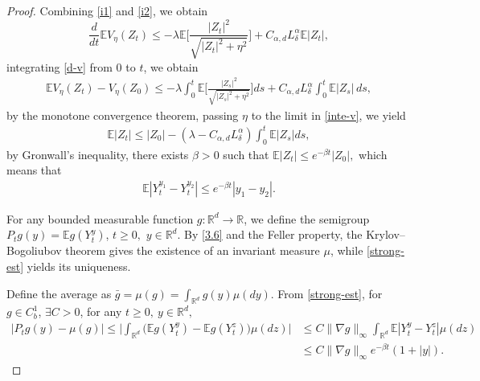 \documentclass[10pt,a4paper]{amsart}
\newcommand{\R}{\mathbb{R}}
\begin{document}
\begin{proof}
	
	Combining \eqref{i1} and \eqref{i2}, we obtain
	\begin{equation}\label{d-v}
		\frac{d}{dt}\mathbb E V_\eta(Z_t)
		\leq-\lambda \mathbb E\bigg[\frac{|Z_t|^2}{\sqrt{|Z_t|^2+\eta^2}}\bigg]
		+C_{\alpha,d}L_\delta^{\alpha}\mathbb E|Z_t|,
	\end{equation}
	integrating \eqref{d-v} from $0$ to $t$, we obtain
	\begin{align}\label{inte-v}
	\mathbb E V_\eta(Z_t)- V_\eta(Z_0)\leq-\lambda\int_0^t \mathbb E\bigg[\frac{|Z_s|^2}{\sqrt{|Z_s|^2+\eta^2}}\bigg]ds+
	C_{\alpha,d}L_\delta^{\alpha}\int_0^t\mathbb E|Z_s|\,ds,
	\end{align}
by the monotone convergence theorem, passing $\eta$ to the limit in \eqref{inte-v}, we yield
\begin{align*}
\mathbb E|Z_t|	\leq |Z_0|-\left(	\lambda-C_{\alpha,d}L_\delta^{\alpha}	\right)\int_{0}^{t}	\mathbb E|Z_s|ds,
\end{align*}
	by Gronwall's inequality, there exists $\beta>0$ such that
$
	\mathbb E|Z_t|\leq e^{-\beta t}|Z_0|,
$
	which means that
	\begin{align*}
	\mathbb E|Y_t^{y_1}-Y_t^{y_2}|\leq e^{-\beta t}|y_1-y_2|.
	\end{align*}

For any bounded measurable function $g:\mathbb{R}^{d}\rightarrow \mathbb{R}$,  we define the semigroup
$ P_{t}g(y)=\mathbb{E}g(Y_{t}^{ y})$,  $t\geq 0,$  $y\in \mathbb{R}^{d}.$ By \eqref{3.6} and the Feller property, the Krylov--Bogoliubov theorem
gives the existence of an invariant measure $\mu$, while
\eqref{strong-est} yields its uniqueness.

Define the average as
$
\bar{g}=\mu(g)=\int_{\R^{d}}g(y)\mu(dy).
$
	 From \eqref{strong-est}, for $g\in C^1_b$, $\exists C>0$,  for any $ t\geq0, \ y\in \mathbb R^{d},$
\begin{align*}
	\left| P_{t}g(y)-\mu(g)\right| %
	\leq \bigg|  \int_{\R^{d}}\big(\mathbb{E}g(Y^{y}_t)-\mathbb{E}g(Y^{z}_t) \big) \mu(dz)\bigg|&\leq C \|\nabla g\|_\infty\int_{\R^{d}}	\mathbb E|Y_t^{y}-Y_t^{z}| \mu(dz)\\
	& \leq C\|\nabla g\|_\infty e^{-\beta t}(1+|y|).
\end{align*}
\end{proof}
\end{document}
